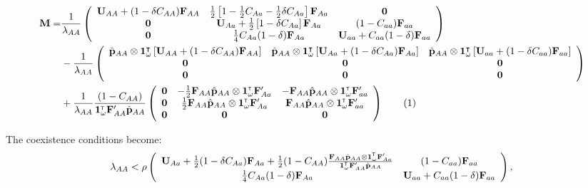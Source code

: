 \documentclass[11pt]{article}
\newcommand\numberthis{\addtocounter{equation}{1}\tag{\theequation}}
\def\mbf#1{\mathbf{#1}}
\newcommand{\tr}{{\mbox{\tiny \sf T}}}
\begin{document}
{
\footnotesize
\begin{align*} \label{eq:combinedM}
	\mbf{M} = 
			& \frac{1}{\lambda_{AA}}\left(
			\begin{array}{ccc}
				\mathbf{U}_{AA}+(1 - \delta C_{AA}) \mbf{F}_{AA}  & \frac{1}{2} \left[1-\frac{1}{2} C_{Aa} - \frac{1}{2} \delta C_{Aa} \right] \mbf{F}_{Aa}  & \mbf{0}\\ 
				\mbf{0} & \mathbf{U}_{Aa} +\frac{1}{2} \left[1- \delta C_{Aa} \right] \mbf{F}_{Aa} & (1 - C_{aa})\mbf{F}_{aa}  \\
				\mbf{0} & \frac{1}{4} C_{Aa} (1 - \delta) \mbf{F}_{Aa}  & \mathbf{U}_{aa} +C_{aa} (1 - \delta) \mbf{F}_{aa} 
			\end{array} \right)\\ 
	&-\frac{1}{\lambda_{AA}} \left(
			\begin{array}{ccc}
				\hat{\mbf{p}}_{AA} \otimes \mbf{1}^{\intercal}_{\omega} \left[\mbf{U}_{AA}+(1 - \delta C_{AA}) \mbf{F}_{AA}\right]  & \hat{\mbf{p}}_{AA} \otimes \mbf{1}^{\intercal}_{\omega} \left[\mbf{U}_{Aa}+(1 - \delta C_{Aa}) \mbf{F}_{Aa}\right] & \hat{\mbf{p}}_{AA} \otimes \mbf{1}^{\intercal}_{\omega} \left[\mbf{U}_{aa}+(1 - \delta C_{aa}) \mbf{F}_{aa}\right] \\ 
				\mbf{0} & \mbf{0} & \mbf{0}  \\
				\mbf{0} & \mbf{0} & \mbf{0} 
			\end{array} \right)\\
			&+\frac{1}{\lambda_{AA}}\frac{(1 - C_{AA})}{\mathbf{1}^\tr_\omega \mathbf{F}_{AA}^\prime \hat{\mathbf{p}}_{AA}} \left(
			\begin{array}{ccc}
				\mbf{0}   & -\frac{1}{2} \mbf{F}_{AA} \hat{\mbf{p}}_{AA} \otimes \mathbf{1}^\tr_{\omega} \mathbf{F}_{Aa}^\prime&  - \mbf{F}_{AA} \hat{\mbf{p}}_{AA} \otimes \mathbf{1}^\tr_{\omega} \mathbf{F}_{aa}^\prime \\ 
						\mbf{0}   & \frac{1}{2} \mbf{F}_{AA} \hat{\mbf{p}}_{AA} \otimes \mathbf{1}^\tr_{\omega} \mathbf{F}_{Aa}^\prime&  \mbf{F}_{AA} \hat{\mbf{p}}_{AA}  \otimes \mathbf{1}^\tr_{\omega} \mathbf{F}_{aa}^\prime \\  
				\mbf{0} & \mbf{0} & \mbf{0} 
			\end{array} \right) 
			\numberthis
\end{align*}
}




The coexistence conditions become:
\begin{equation} \label{eq:coexist_bigAA}
	\lambda_{AA} < 
			\rho\left(\begin{array}{cc}
\mathbf{U}_{Aa} + \frac{1}{2} (1 - \delta C_{Aa}) \mbf{F}_{Aa} +\frac{1}{2} (1 - C_{AA})\frac{\mbf{F}_{AA}\hat{\mbf{p}}_{AA}\otimes \mathbf{1}^\tr_{\omega} \mathbf{F}_{Aa}^\prime}{\mathbf{1}^\tr_\omega \mathbf{F}_{AA}^\prime \hat{\mathbf{p}}_{AA}	} & (1-C_{aa}) \mbf{F}_{aa} \\
\frac{1}{4} C_{Aa} (1 - \delta) \mbf{F}_{Aa}  &\mathbf{U}_{aa} +C_{aa} (1 - \delta) \mbf{F}_{aa}  \\ 
			\end{array} \right), \\ 
\end{equation} 
\end{document}
